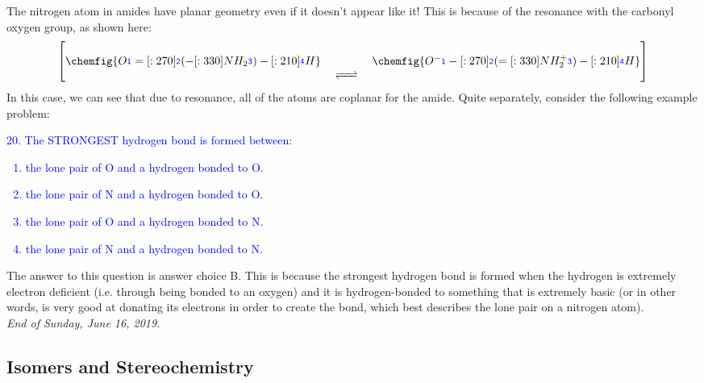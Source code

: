 \documentclass{article}
\newcommand{\mcfatomno}[1]{\raisebox{2pt}{\color{blue}{\ensuremath{\mathsf{_{#1}}}}}}
\theoremstyle{plain}%
\theoremstyle{definition}
\theoremstyle{remark}
\begin{document}
\indent The nitrogen atom in amides have planar geometry even if it doesn't appear like it! This is because of the resonance with the carbonyl oxygen group, as shown here:
\begin{equation}
\begin{split}
\begin{bmatrix}
\chemfig{
           O\mcfatomno{1}%
    =[:270]\mcfatomno{2}%
              (
        -[:330]{NH_2}\mcfatomno{3}%
              )
    -[:210]\mcfatomno{4}H%
}
\quad\begin{matrix}
\\
\\
\text{\ce{<=>}}
\end{matrix}\quad
\chemfig{
           {O^-}\mcfatomno{1}%
    -[:270]\mcfatomno{2}%
              (
        =[:330]{NH_2^+}\mcfatomno{3}%
              )
    -[:210]\mcfatomno{4}H%
}
\end{bmatrix}
\end{split}
\end{equation}
\noindent In this case, we can see that due to resonance, all of the atoms are coplanar for the amide. Quite separately, consider the following example problem:
\begin{center}
\begin{minipage}{30em}
\textcolor{blue}{20. \quad The STRONGEST hydrogen bond is formed between:
\begin{enumerate}[label=\Alph*]
	\item the lone pair of O and a hydrogen bonded to O.
	\item the lone pair of N and a hydrogen bonded to O.
	\item the lone pair of O and a hydrogen bonded to N.
	\item the lone pair of N and a hydrogen bonded to N.
\end{enumerate}}
\end{minipage}
\end{center}
\noindent The answer to this question is answer choice B. This is because the strongest hydrogen bond is formed when the hydrogen is extremely electron deficient (i.e. through being bonded to an oxygen) and it is hydrogen-bonded to something that is extremely basic (or in other words, is very good at donating its electrons in order to create the bond, which best describes the lone pair on a nitrogen atom). \\
\noindent \footnotesize \textit{End of Sunday, June 16, 2019.}
\normalsize

\subsection{Isomers and Stereochemistry}
\end{document}
